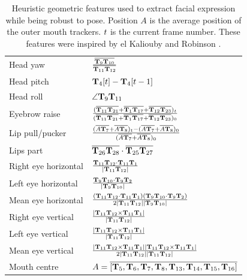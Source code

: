 \begin{table}[tb]
\centering
\caption[Heuristic geometric features used to extract facial expression while being robust to pose.]{Heuristic geometric features used to extract facial expression while being robust to pose. Position $A$ is the average position of the outer mouth trackers. $t$ is the current frame number. These features were inspired by el Kaliouby and Robinson \cite{Kaliouby2005}.}
\begin{tabular}{ l l }
Head yaw & $\frac{\overline{\textbf{T}_{9} \textbf{T}_{10}}}{\overline{\textbf{T}_{11} \textbf{T}_{12}}}$ \\
Head pitch & $\textbf{T}_{4}[t] - \textbf{T}_{4}[t-1]$\\
Head roll & $\angle \textbf{T}_{9} \textbf{T}_{11}$\\
Eyebrow raise & $\frac{(\overline{\textbf{T}_{11}\textbf{T}_{21}}+\overline{\textbf{T}_{1}\textbf{T}_{17}}+\overline{\textbf{T}_{12}\textbf{T}_{23}})_{t}}{(\overline{\textbf{T}_{11}\textbf{T}_{21}}+\overline{\textbf{T}_{1}\textbf{T}_{17}}+\overline{\textbf{T}_{12}\textbf{T}_{23}})_{0}}$\\
Lip pull/pucker & $\frac{(\overline{A\textbf{T}_{7}}+\overline{A\textbf{T}_{8}})_{t}-(\overline{A\textbf{T}_{7}}+\overline{A\textbf{T}_{8}})_{0}}{(\overline{A\textbf{T}_{7}}+\overline{A\textbf{T}_{8}})_{0}}$ \\
Lips part & $\overline{\textbf{T}_{26} \textbf{T}_{28}} \cdot \overline{\textbf{T}_{25} \textbf{T}_{27}}$ \\
Right eye horizontal & $\frac{\textbf{T}_{11}\textbf{T}_{12}\cdot \textbf{T}_{11}\textbf{T}_{1}}{|\textbf{T}_{11}\textbf{T}_{12}|}$\\
Left eye horizontal & $\frac{\textbf{T}_{9}\textbf{T}_{10}\cdot \textbf{T}_{9}\textbf{T}_{2}}{|\textbf{T}_{9}\textbf{T}_{10}|}$\\
Mean eye horizontal & $\frac{(\textbf{T}_{11}\textbf{T}_{12}\cdot \textbf{T}_{11}\textbf{T}_{1}) (\textbf{T}_{9}\textbf{T}_{10}\cdot \textbf{T}_{9}\textbf{T}_{2})}{2|\textbf{T}_{11}\textbf{T}_{12}||\textbf{T}_{9}\textbf{T}_{10}|}$\\
Right eye vertical & $\frac{|\textbf{T}_{11}\textbf{T}_{12}\times \textbf{T}_{11}\textbf{T}_{1}|}{|\textbf{T}_{11}\textbf{T}_{12}|}$ \\
Left eye vertical & $\frac{|\textbf{T}_{11}\textbf{T}_{12}\times \textbf{T}_{11}\textbf{T}_{1}|}{|\textbf{T}_{11}\textbf{T}_{12}|}$ \\
Mean eye vertical & $\frac{|\textbf{T}_{11}\textbf{T}_{12}\times \textbf{T}_{11}\textbf{T}_{1}| |\textbf{T}_{11}\textbf{T}_{12}\times \textbf{T}_{11}\textbf{T}_{1}|}{2|\textbf{T}_{11}\textbf{T}_{12}||\textbf{T}_{11}\textbf{T}_{12}|}$\\
Mouth centre & $A=\overline{[\textbf{T}_{5},\textbf{T}_{6},\textbf{T}_{7},\textbf{T}_{8},\textbf{T}_{13},\textbf{T}_{14},\textbf{T}_{15},\textbf{T}_{16}]}$
\end{tabular}
\label{GeometryFeaturesTable}
\end{table}

